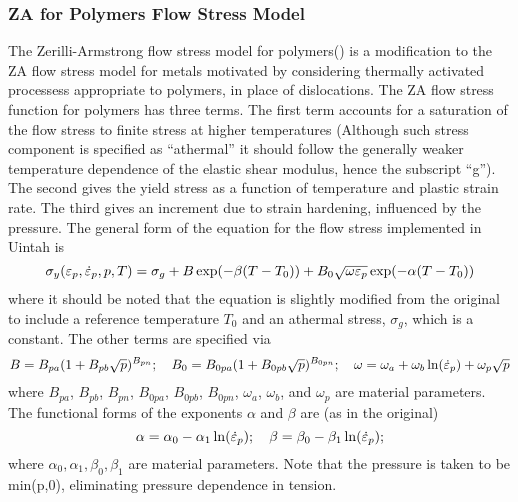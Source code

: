   \subsubsection{ZA for Polymers Flow Stress Model}
  The Zerilli-Armstrong flow stress model for polymers(\cite{Zerilli07})
  is a modification to the ZA flow stress model for metals motivated by considering
  thermally activated processess appropriate to polymers, in place of
  dislocations.  The ZA flow stress function for polymers has three terms.  
  The first term accounts for a saturation of the flow stress to finite stress 
  at higher temperatures (Although such stress component is specified as ``athermal'' 
  it should follow the generally weaker temperature dependence of the elastic 
  shear modulus, hence the subscript ``g''). The second gives the yield stress as 
  a function of temperature and plastic strain rate. The third gives an increment 
  due to strain hardening, influenced by the pressure. The general form of the
  equation for the flow stress implemented in Uintah is
  \begin{equation}
    \sigma_y(\varepsilon_p,\dot{\varepsilon}_{p},p,T) = 
      \sigma_g + B\exp(-\beta(T-T_0)) + 
                           B_0\sqrt{\omega\varepsilon_p}\exp(-\alpha(T-T_0))
  \end{equation}
  where it should be noted that the equation is slightly modified from the
  original to include a reference temperature $T_0$ and an athermal stress, 
  $\sigma_g$, which is a constant.  The other terms are specified via
  \begin{equation}
    B=B_{pa}(1+B_{pb}\sqrt{p})^{B_{pn}};\quad
    B_0=B_{0pa}(1+B_{0pb}\sqrt{p})^{B_{0pn}};\quad
    \omega=\omega_a+\omega_b\ln(\dot{\varepsilon}_{p})+\omega_p \sqrt{p}
  \end{equation}
  where $B_{pa}$, $B_{pb}$, $B_{pn}$, $B_{0pa}$, $B_{0pb}$, $B_{0pn}$, $\omega_a$, $\omega_b$, 
  and $\omega_p$ are material parameters.  The functional forms of the exponents
  $\alpha$ and $\beta$ are (as in the original)
  \begin{equation}
    \alpha = \alpha_0 - \alpha_1 \ln(\dot{\varepsilon}_{p}); \quad
    \beta = \beta_0 - \beta_1 \ln(\dot{\varepsilon}_{p}); 
  \end{equation}
  where $\alpha_0, \alpha_1, \beta_0, \beta_1$ are material parameters.  Note that the
  pressure is taken to be min(p,0), eliminating pressure dependence in tension.

